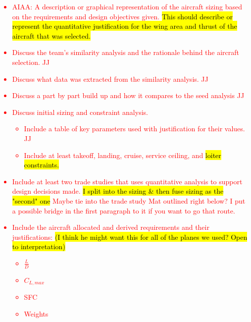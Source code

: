 \textcolor{red}{\begin{itemize}
    \item AIAA: A description or graphical representation of the aircraft sizing based on the
requirements and design objectives given. \hl{This should describe or represent the
quantitative justification for the wing area and thrust of the aircraft that was selected.} 
    \item Discuss the team’s similarity analysis and the rationale behind the aircraft selection. \checkmark JJ
    \item Discuss what data was extracted from the similarity analysis. \checkmark JJ
    \item Discuss a part by part build up and how it compares to the seed analysis \checkmark JJ
    \item Discuss initial sizing and constraint analysis. 
    \begin{itemize}
        \item Include a table of key parameters used with justification for their values. \checkmark JJ
        \item Include at least takeoff, landing, cruise, service ceiling, and \hl{loiter constraints.}
    \end{itemize}
    \item Include at least two trade studies that uses quantitative analysis to support design decisions made. \hl{I split into the sizing \& then fuse sizing as the "second" one}  Maybe tie into the trade study Mat outlined right below? I put a possible bridge in the first paragraph to it if you want to go that route. 
    \item Include the aircraft allocated and derived requirements and their justifications: \hl{(I think he might want this for all of the planes we used? Open to interpretation)}
    \begin{itemize}
        \item $\frac{L}{D}$
        \item $C_{L,max}$
        \item SFC
        \item Weights
    \end{itemize}
\end{itemize}}